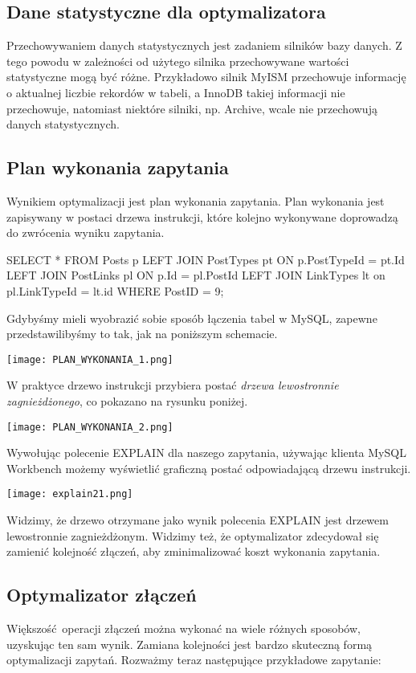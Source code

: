 \subsection{Dane statystyczne dla optymalizatora}
Przechowywaniem danych statystycznych jest zadaniem silników bazy danych. Z tego powodu w zależności od użytego silnika przechowywane wartości statystyczne mogą być różne. Przykładowo silnik MyISM przechowuje informację o aktualnej liczbie rekordów w tabeli, a InnoDB takiej informacji nie przechowuje, natomiast niektóre silniki, np. Archive, wcale nie przechowują danych statystycznych.

\subsection{Plan wykonania zapytania}
Wynikiem optymalizacji jest plan wykonania zapytania. Plan wykonania jest zapisywany w postaci drzewa instrukcji, które kolejno wykonywane doprowadzą do zwrócenia wyniku zapytania.
\begin{spverbatim}
	SELECT * FROM Posts p LEFT JOIN PostTypes pt ON p.PostTypeId = pt.Id LEFT JOIN PostLinks pl ON p.Id = pl.PostId LEFT JOIN LinkTypes lt on pl.LinkTypeId = lt.id WHERE PostID = 9;
\end{spverbatim}
Gdybyśmy mieli wyobrazić sobie sposób łączenia tabel w MySQL, zapewne przedstawilibyśmy to tak, jak na poniższym schemacie.
 \begin{center}
 	\texttt{[image: PLAN\_WYKONANIA\_1.png]} 
 \end{center}
W praktyce drzewo instrukcji przybiera postać \textit{drzewa lewostronnie zagnieżdżonego}, co pokazano na rysunku poniżej.
\begin{center}
	\texttt{[image: PLAN\_WYKONANIA\_2.png]} 
\end{center}
Wywołując polecenie EXPLAIN dla naszego zapytania, używając klienta MySQL Workbench możemy wyświetlić graficzną postać odpowiadającą drzewu instrukcji.
\begin{center}
	\texttt{[image: explain21.png]} 
\end{center}
Widzimy, że drzewo otrzymane jako wynik polecenia EXPLAIN jest drzewem lewostronnie zagnieżdżonym. Widzimy też, że optymalizator zdecydował się zamienić kolejność złączeń, aby zminimalizować koszt wykonania zapytania.

\subsection{Optymalizator złączeń}
Większość operacji złączeń można wykonać na wiele różnych sposobów, uzyskując ten sam wynik. Zamiana kolejności jest bardzo skuteczną formą optymalizacji zapytań. Rozważmy teraz następujące przykładowe zapytanie:


